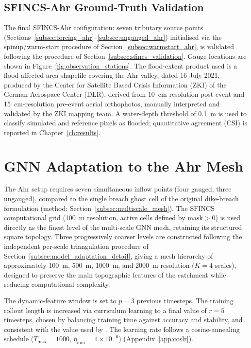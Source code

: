 \documentclass[12pt,a4paper]{report}
\begin{document}
{\subsection{SFINCS-Ahr Ground-Truth Validation}
\label{subsec:sfincs_validation_ahr}

The final SFINCS-Ahr configuration: seven tributary source points
(Sections~\ref{subsec:forcing_ahr}--\ref{subsec:ungauged_ahr}) initialised via the
spinup/warm-start procedure of Section~\ref{subsec:warmstart_ahr}, is validated
following the procedure of Section~\ref{subsec:sfincs_validation}. Gauge locations
are shown in Figure~\ref{fig:observation_stations}. The flood-extent product used is
a flood-affected-area shapefile covering the Ahr valley, dated 16 July 2021,
produced by the Center for Satellite Based Crisis Information (ZKI) of the German
Aerospace Center (DLR), derived from 10~cm-resolution post-event and 15~cm-resolution
pre-event aerial orthophotos, manually interpreted and validated by the ZKI mapping
team. A water-depth threshold of 0.1~m is used to classify simulated and reference
pixels as flooded; quantitative agreement (CSI) is reported in
Chapter~\ref{ch:results}.

\section{GNN Adaptation to the Ahr Mesh}
\label{sec:gnn_ahr}

The Ahr setup requires seven simultaneous inflow points (four gauged, three ungauged),
compared to the single breach ghost cell of the original dike-breach formulation
(method: Section~\ref{subsec:multiscale_mesh}). The SFINCS computational grid
(100~m resolution, active cells defined by $\mathrm{mask}>0$) is used directly as the
finest level of the multi-scale GNN mesh, retaining its structured square topology.
Three progressively coarser levels are constructed following the independent per-scale triangulation procedure of Section~\ref{subsec:model_adaptation_detail}, giving a
mesh hierarchy of approximately 100~m, 500~m, 1000~m, and 2000~m resolution ($K=4$
scales), designed to preserve the main topographic features of the catchment while
reducing computational complexity.

The dynamic-feature window is set to $p=3$ previous timesteps.
The training rollout length is increased
via curriculum learning to a final value of $r=5$ timesteps, chosen by balancing
training time against accuracy and stability, and consistent with the value used by
\citet{bentivoglio2025mswegnn}.
The learning rate follows a cosine-annealing schedule
($T_\text{max}=1000$, $\eta_\text{min}=1\times10^{-6}$) (Appendix~\ref{app:coslr}).


}
\end{document}
